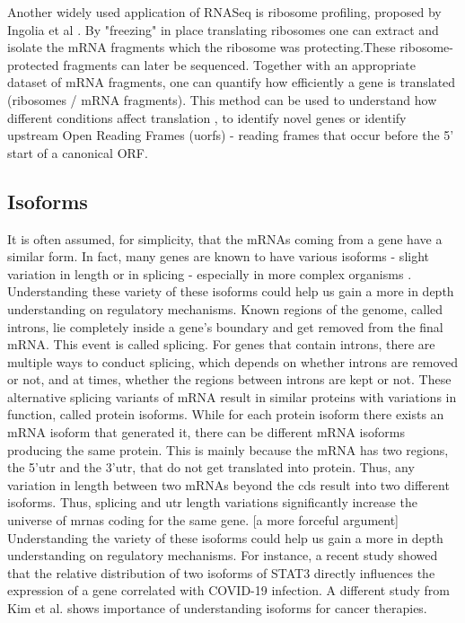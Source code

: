 \documentclass[12pt]{article}
\begin{document}
    Another widely used application of RNASeq is ribosome profiling, proposed by Ingolia et al \cite{Ingolia2012}. By "freezing" in place translating ribosomes one can extract and isolate the mRNA fragments which the ribosome was protecting.These ribosome-protected fragments can later be sequenced. Together with an appropriate dataset of mRNA fragments, one can quantify how efficiently a gene is translated (ribosomes / mRNA fragments). This method can be used to understand how different conditions affect translation \cite{Zhong2016, Chothani2019}, to identify novel genes or identify upstream Open Reading Frames (u\acrshort{orf}s) - reading frames that occur before the 5' start of a canonical \gls{ORF}.
    
    
\subsection{Isoforms}
It is often assumed, for simplicity, that the mRNAs coming from a gene have a similar form. In fact, many genes are known to have various isoforms - slight variation in length or in splicing - especially in more complex organisms \cite{Rees2003, Hunt1992}. Understanding these variety of these isoforms could help us gain a more in depth understanding on regulatory mechanisms. Known regions of the genome, called introns, lie completely inside a gene's boundary and get removed from the final mRNA. This event is called splicing. For genes that contain introns, there are multiple ways to conduct splicing, which depends on whether introns are removed or not, and at times, whether the regions between introns are kept or not. These alternative splicing variants of mRNA result in similar proteins with variations in function, called protein isoforms. 
While for each protein isoform there exists an mRNA isoform that generated it, there can be different mRNA isoforms producing the same protein. This is mainly because the mRNA has two regions, the 5'\acrshort{utr} and the 3'\acrshort{utr}, that do not get translated into protein. Thus, any variation in length between two mRNAs beyond the \gls{cds} result into two different isoforms. Thus, splicing and \acrshort{utr} length variations significantly increase the universe of \acrshort{mrna}s coding for the same gene.
[a more forceful argument]
Understanding the variety of these isoforms could help us gain a more in depth understanding on regulatory mechanisms. For instance, a recent study \cite{Shamir2020} showed that the relative distribution of two isoforms of STAT3 directly influences the expression of a gene correlated with COVID-19 infection. A different study from Kim et al. \cite{Kim2009} shows importance of understanding isoforms for cancer therapies. 
\end{document}
